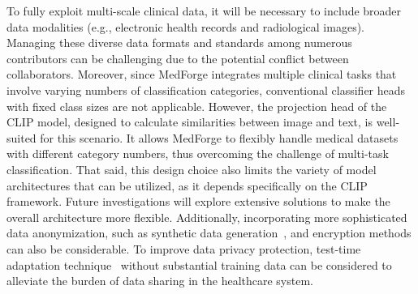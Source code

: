 To fully exploit multi-scale clinical data, it will be necessary to include broader data modalities (e.g., electronic health records and radiological images). Managing these diverse data formats and standards among numerous contributors can be challenging due to the potential conflict between collaborators. 
Moreover, since MedForge integrates multiple clinical tasks that involve varying numbers of classification categories, conventional classifier heads with fixed class sizes are not applicable. However, the projection head of the CLIP model, designed to calculate similarities between image and text, is well-suited for this scenario. It allows MedForge to flexibly handle medical datasets with different category numbers, thus overcoming the challenge of multi-task classification. That said, this design choice also limits the variety of model architectures that can be utilized, as it depends specifically on the CLIP framework. Future investigations will explore extensive solutions to make the overall architecture more flexible. Additionally, incorporating more sophisticated data anonymization, such as synthetic data generation~\cite{ding2023large}, and encryption methods can also be considerable. To improve data privacy protection, test-time adaptation technique~\cite{wang2020tent, liang2024comprehensive} without substantial training data can be considered to alleviate the burden of data sharing in the healthcare system.



             

